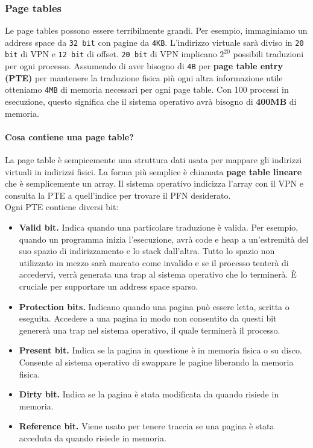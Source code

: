 \documentclass[12pt, twoside, letterpaper]{article}
\begin{document}
			\subsubsection{Page tables}
				Le page tables possono essere terribilmente grandi. Per esempio, immaginiamo un address space da \texttt{32 bit} con pagine da \texttt{4KB}. L'indirizzo virtuale sarà diviso in \texttt{20 bit} di VPN e \texttt{12 bit} di offset. \texttt{20 bit} di VPN implicano $2^{20}$ possibili traduzioni per ogni processo. Assumendo di aver bisogno di \texttt{4B} per \textbf{page table entry (PTE)} per mantenere la traduzione fisica più ogni altra informazione utile otteniamo \texttt{4MB} di memoria necessari per ogni page table. Con 100 processi in esecuzione, questo significa che il sistema operativo avrà bisogno di \textbf{400MB} di memoria. 
				\paragraph{Cosa contiene una page table?} La page table è sempicemente una struttura dati usata per mappare gli indirizzi virtuali in indirizzi fisici. La forma più semplice è chiamata \textbf{page table lineare} che è semplicemente un array. Il sistema operativo indicizza l'array con il VPN e consulta la PTE a quell'indice per trovare il PFN desiderato.\\ 
				Ogni PTE contiene diversi bit:
				\begin{itemize}
					\item \textbf{Valid bit.} Indica quando una particolare traduzione è valida. Per esempio, quando un programma inizia l'esecuzione, avrà code e heap a un'estremità del suo spazio di indirizzamento e lo stack dall'altra. Tutto lo spazio non utilizzato in mezzo sarà marcato come invalido e se il processo tenterà di accedervi, verrà generata una trap al sistema operativo che lo terminerà. È cruciale per supportare un address space sparso. 
					\item \textbf{Protection bits.} Indicano quando una pagina può essere letta, scritta o eseguita. Accedere a una pagina in modo non consentito da questi bit genererà una trap nel sistema operativo, il quale terminerà il processo.
					\item \textbf{Present bit.} Indica se la pagina in questione è in memoria fisica o su disco. Consente al sistema operativo di swappare le pagine liberando la memoria fisica.
					\item \textbf{Dirty bit.} Indica se la pagina è stata modificata da quando risiede in memoria.
					\item \textbf{Reference bit.} Viene usato per tenere traccia se una pagina è stata acceduta da quando risiede in memoria. 
				\end{itemize}
			
\end{document}

